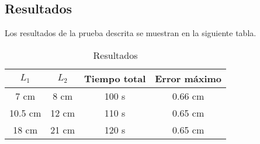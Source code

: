 \subsection{Resultados}

Los resultados de la prueba descrita se muestran en la siguiente tabla.

\begin{table}[ht]
	\centering
	\begin{tabular}{|c|c|c|c|}
		\hline
		\textbf{$L_1$} & \textbf{$L_2$} & \textbf{Tiempo total} & \textbf{Error máximo} \\
		\hline
		7 cm  & 8 cm  & 100 s & 0.66 cm \\
		10.5 cm & 12 cm & 110 s & 0.65 cm \\
		18 cm  & 21 cm & 120 s & 0.65 cm \\
		\hline
	\end{tabular}
	\caption{Resultados}
\end{table}